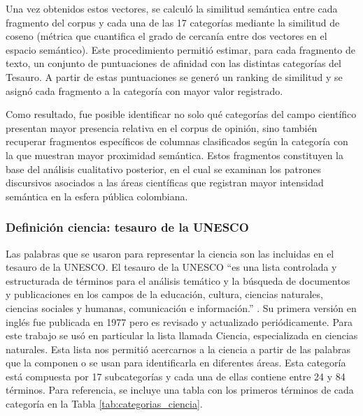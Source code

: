 \documentclass[11pt,a4paper]{article}
\begin{document}
Una vez obtenidos estos vectores, se calculó la similitud semántica entre cada fragmento del corpus y cada una de las 17 categorías mediante la similitud de coseno (métrica que cuantifica el grado de cercanía entre dos vectores en el espacio semántico). Este procedimiento permitió estimar, para cada fragmento de texto, un conjunto de puntuaciones de afinidad con las distintas categorías del Tesauro. A partir de estas puntuaciones se generó un ranking de similitud y se asignó cada fragmento a la categoría con mayor valor registrado.
	
Como resultado, fue posible identificar no solo qué categorías del campo científico presentan mayor presencia relativa en el corpus de opinión, sino también recuperar fragmentos específicos de columnas clasificados según la categoría con la que muestran mayor proximidad semántica. Estos fragmentos constituyen la base del análisis cualitativo posterior, en el cual se examinan los patrones discursivos asociados a las áreas científicas que registran mayor intensidad semántica en la esfera pública colombiana.

	
	\subsubsection{Definición ciencia: tesauro de la UNESCO}
	Las palabras que se usaron para representar la ciencia son las incluidas en el tesauro de la UNESCO.
	El tesauro de la UNESCO ``es una lista controlada y estructurada de términos para el análisis temático y la búsqueda de documentos y publicaciones en los campos de la educación, cultura, ciencias naturales, ciencias sociales y humanas, comunicación e información.'' \cite{unesco_thesaurus_1977}. 
	Su primera versión en inglés fue publicada en 1977 pero es revisado y actualizado periódicamente. Para este trabajo se usó en particular la lista llamada Ciencia, especializada en ciencias naturales. Esta lista nos permitió acercarnos a la ciencia a partir de las palabras que la componen o se usan para identificarla en diferentes áreas. Esta categoría está compuesta por 17 subcategorías y cada una de ellas contiene entre 24 y 84 términos.
	Para referencia, se incluye una tabla con los primeros términos de cada categoría en la Tabla \ref{tab:categorias_ciencia}.
	
\end{document}
